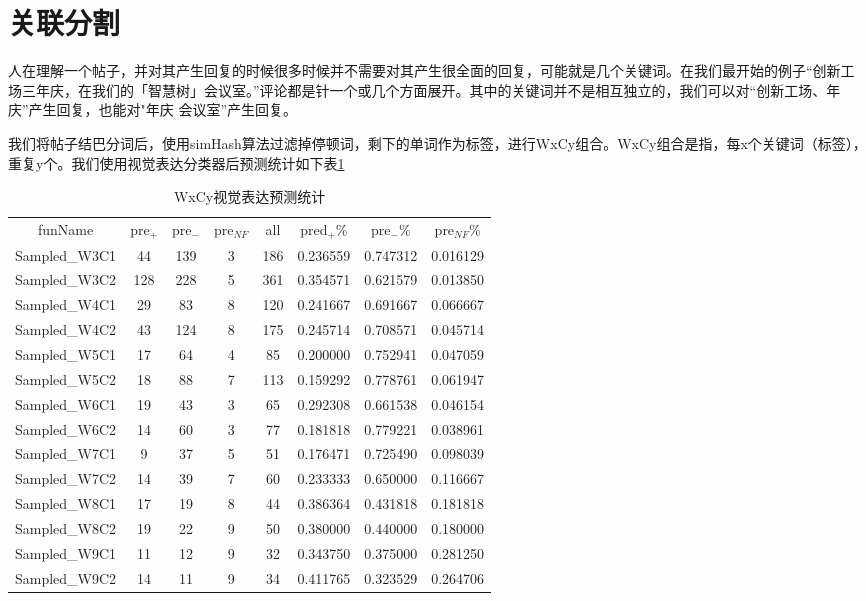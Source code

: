\section{关联分割}

人在理解一个帖子，并对其产生回复的时候很多时候并不需要对其产生很全面的回复，可能就是几个关键词。在我们最开始的例子“创新工场三年庆，在我们的「智慧树」会议室。”评论都是针一个或几个方面展开。其中的关键词并不是相互独立的，我们可以对“创新工场、年庆”产生回复，也能对"年庆 会议室”产生回复。

我们将帖子结巴分词后，使用simHash算法过滤掉停顿词，剩下的单词作为标签，进行WxCy组合。WxCy组合是指，每x个关键词（标签），重复y个。我们使用视觉表达分类器后预测统计如下表\ref{tab:pred_WxCy}

\begin{table}[htbp]
\centering
\caption{WxCy视觉表达预测统计} \label{tab:pred_WxCy}
\begin{tabular}{|c|c|c|c|c|c|c|c|}
    \hline
    funName	 & pre$_{+}$	& pre$_{-}$	 & pre$_{NF}$	& all	& pred$_{+}$\%	& pre$_{-}$\% & 	pre$_{NF}$\% \\
Sampled\_W3C1	& 44	& 139 &	3& 	186 &	0.236559	 & 0.747312	& 0.016129 \\ 
\hline
Sampled\_W3C2	& 128	& 228 &	5& 	361 &	0.354571	 & 0.621579	& 0.013850 \\ 
\hline
Sampled\_W4C1	& 29	& 83 &	8& 	120 &	0.241667	 & 0.691667	& 0.066667 \\ 
\hline
Sampled\_W4C2	& 43	& 124 &	8& 	175 &	0.245714	 & 0.708571	& 0.045714 \\ 
\hline
Sampled\_W5C1	& 17	& 64 &	4& 	85 &	0.200000	 & 0.752941	& 0.047059 \\ 
\hline
Sampled\_W5C2	& 18	& 88 &	7& 	113 &	0.159292	 & 0.778761	& 0.061947 \\ 
\hline
Sampled\_W6C1	& 19	& 43 &	3& 	65 &	0.292308	 & 0.661538	& 0.046154 \\ 
\hline
Sampled\_W6C2	& 14	& 60 &	3& 	77 &	0.181818	 & 0.779221	& 0.038961 \\ 
\hline
Sampled\_W7C1	& 9	& 37 &	5& 	51 &	0.176471	 & 0.725490	& 0.098039 \\ 
\hline
Sampled\_W7C2	& 14	& 39 &	7& 	60 &	0.233333	 & 0.650000	& 0.116667 \\ 
\hline
Sampled\_W8C1	& 17	& 19 &	8& 	44 &	0.386364	 & 0.431818	& 0.181818 \\ 
\hline
Sampled\_W8C2	& 19	& 22 &	9& 	50 &	0.380000	 & 0.440000	& 0.180000 \\ 
\hline
Sampled\_W9C1	& 11	& 12 &	9& 	32 &	0.343750	 & 0.375000	& 0.281250 \\ 
\hline
Sampled\_W9C2	& 14	& 11 &	9& 	34 &	0.411765	 & 0.323529	& 0.264706 \\ 
\hline

\end{tabular}
\end{table}

